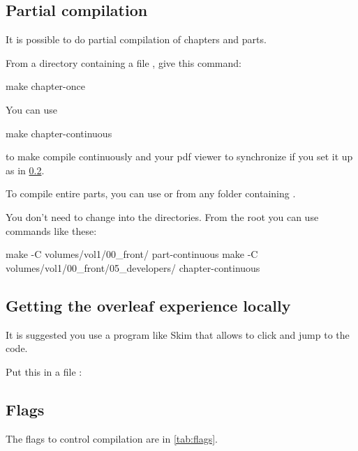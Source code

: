 \subsection{Partial compilation}

It is possible to do partial compilation of chapters and parts.

From a directory containing a file , give this command:

\begin{console}
    make chapter-once
\end{console}

You can use
%
\begin{console}
    make chapter-continuous
\end{console}
%
to make  compile continuously and your pdf viewer to synchronize if you set it up as in \cref{sub:overleaf-experience}.

To compile entire parts, you can use  or  from any folder containing
.

You don't need to change into the directories.
From the root you can use commands like these:
%
\begin{console}
    make -C volumes/vol1/00_front/ part-continuous
    make -C volumes/vol1/00_front/05_developers/ chapter-continuous
\end{console}

\subsection{Getting the overleaf experience locally}
\label{sub:overleaf-experience}
It is suggested you use a program like Skim that allows to click and jump to the code.

Put this in a file :


\subsection{Flags}

The flags to control compilation are in \cref{tab:flags}.

